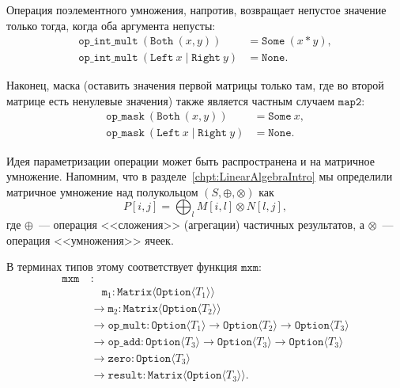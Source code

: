 Операция поэлементного умножения, напротив, возвращает непустое значение только тогда, когда оба аргумента непусты:
\begin{align*}
    \texttt{op\_int\_mult}\ (\texttt{Both}\ (x, y)) &= \texttt{Some}\ (x * y), \\
    \texttt{op\_int\_mult}\ (\texttt{Left}\ x \mid \texttt{Right}\ y) &= \texttt{None}.
\end{align*}

Наконец, маска (оставить значения первой матрицы только там, где во второй матрице есть ненулевые значения) также является частным случаем $\texttt{map2}$:
\begin{align*}
    \texttt{op\_mask}\ (\texttt{Both}\ (x, y)) &= \texttt{Some}\ x, \\
    \texttt{op\_mask}\ (\texttt{Left}\ x \mid \texttt{Right}\ y) &= \texttt{None}.
\end{align*}

Идея параметризации операции может быть распространена и на матричное умножение.
Напомним, что в разделе~\ref{chpt:LinearAlgebraIntro} мы определили матричное умножение над полукольцом $(S, \oplus, \otimes)$ как
\[
    P[i,j] = \bigoplus_{l} M[i,l] \otimes N[l,j],
\]
где $\oplus$~--- операция <<сложения>> (агрегации) частичных результатов, а $\otimes$~--- операция <<умножения>> ячеек.

В терминах типов этому соответствует функция $\texttt{mxm}$:
\begin{align*}
    \texttt{mxm}\ & : \\
    & \quad \texttt{m}_1: \texttt{Matrix}\langle\texttt{Option}\langle T_1\rangle\rangle \\
    & \to \texttt{m}_2: \texttt{Matrix}\langle\texttt{Option}\langle T_2\rangle\rangle \\
    & \to \texttt{op\_mult}: \texttt{Option}\langle T_1\rangle \to \texttt{Option}\langle T_2\rangle \to \texttt{Option}\langle T_3\rangle \\
    & \to \texttt{op\_add}: \texttt{Option}\langle T_3\rangle \to \texttt{Option}\langle T_3\rangle \to \texttt{Option}\langle T_3\rangle \\
    & \to \texttt{zero}: \texttt{Option}\langle T_3\rangle \\
    & \to \texttt{result}: \texttt{Matrix}\langle\texttt{Option}\langle T_3\rangle\rangle.
\end{align*}

